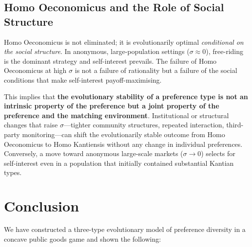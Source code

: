 \documentclass[12pt]{article}
\begin{document}
\subsection{Homo Oeconomicus and the Role of Social Structure}

Homo Oeconomicus is not eliminated; it is evolutionarily optimal \emph{conditional on the social structure}. In anonymous, large-population settings ($\sigma \approx 0$), free-riding is the dominant strategy and self-interest prevails. The failure of Homo Oeconomicus at high $\sigma$ is not a failure of rationality but a failure of the social conditions that make self-interest payoff-maximising.

This implies that \textbf{the evolutionary stability of a preference type is not an intrinsic property of the preference but a joint property of the preference and the matching environment}. Institutional or structural changes that raise $\sigma$---tighter community structures, repeated interaction, third-party monitoring---can shift the evolutionarily stable outcome from Homo Oeconomicus to Homo Kantiensis without any change in individual preferences. Conversely, a move toward anonymous large-scale markets ($\sigma \to 0$) selects for self-interest even in a population that initially contained substantial Kantian types.

\section{Conclusion}\label{sec:conclusion}

We have constructed a three-type evolutionary model of preference diversity in a concave public goods game and shown the following:
\end{document}

